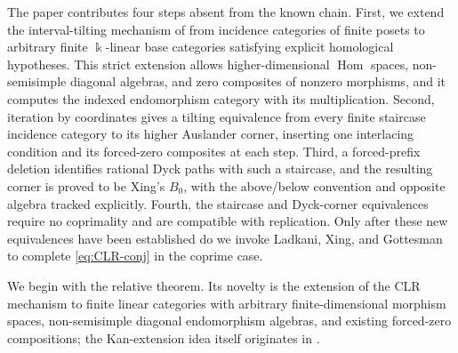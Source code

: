 \documentclass[12pt,a4paper,english,reqno]{amsart}
\theoremstyle{plain}
\theoremstyle{definition}
\newcommand{\kk}{\Bbbk}
\newcommand{\Hom}{\operatorname{Hom}}
\begin{document}
The paper contributes four steps absent from the known chain.  First, we
extend the interval-tilting mechanism of
\cite[Theorem~3.1]{CLR} from incidence categories of finite posets to
arbitrary finite $\kk$-linear base categories satisfying explicit
homological hypotheses.  This strict extension allows higher-dimensional
$\Hom$ spaces, non-semisimple diagonal algebras, and zero composites of
nonzero morphisms, and it computes the indexed endomorphism category with
its multiplication.  Second, iteration by coordinates gives a tilting
equivalence from every finite staircase incidence category to its higher
Auslander corner, inserting one interlacing condition and its forced-zero
composites at each step.  Third, a forced-prefix deletion identifies rational
Dyck paths with such a staircase, and the resulting corner is proved to be
Xing's $B_0$, with the above/below convention and opposite algebra tracked
explicitly.  Fourth, the staircase and Dyck-corner equivalences require no
coprimality and are compatible with replication.  Only after these new
equivalences have been established do we invoke Ladkani, Xing, and Gottesman
to complete \eqref{eq:CLR-conj} in the coprime case.

We begin with the relative theorem.  Its novelty is the extension of the CLR
mechanism to finite linear categories with arbitrary finite-dimensional
morphism spaces, non-semisimple diagonal endomorphism algebras, and existing
forced-zero compositions; the Kan-extension idea itself originates in
\cite[Theorem~3.1]{CLR}.
\end{document}
